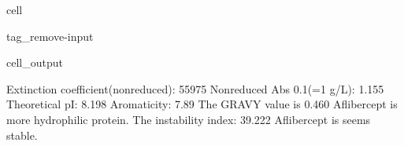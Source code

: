 \documentclass[letterpaper,10pt,english]{jupyterBook}
\begin{document}
\begin{sphinxuseclass}{cell}
\begin{sphinxuseclass}{tag_remove-input}
\begin{sphinxVerbatimOutput}
\begin{sphinxuseclass}{cell_output}
\begin{sphinxVerbatim}[commandchars=\\\{\}]
\PYGZsh{} Extinction coefficient(non\PYGZhy{}reduced): \PYGZhy{}\PYGZhy{}\PYGZhy{}\PYGZhy{}\PYGZhy{}\PYGZhy{}\PYGZhy{}\PYGZhy{}\PYGZhy{}\PYGZhy{}\PYGZhy{}\PYGZhy{}\PYGZhy{}\PYGZhy{}\PYGZhy{}\PYGZhy{}\PYGZhy{}\PYGZhy{}\PYGZhy{}\PYGZhy{}\PYGZhy{}\PYGZhy{}55975
\PYGZsh{} Non\PYGZhy{}reduced Abs 0.1\PYGZpc{}(=1 g/L): \PYGZhy{}\PYGZhy{}\PYGZhy{}\PYGZhy{}\PYGZhy{}\PYGZhy{}\PYGZhy{}\PYGZhy{}\PYGZhy{}\PYGZhy{}\PYGZhy{}\PYGZhy{}\PYGZhy{}\PYGZhy{}\PYGZhy{}\PYGZhy{}\PYGZhy{}\PYGZhy{}\PYGZhy{}\PYGZhy{}\PYGZhy{}\PYGZhy{}\PYGZhy{}\PYGZhy{}\PYGZhy{}\PYGZhy{}\PYGZhy{}\PYGZhy{}\PYGZhy{}1.155
\PYGZsh{} Theoretical pI: \PYGZhy{}\PYGZhy{}\PYGZhy{}\PYGZhy{}\PYGZhy{}\PYGZhy{}\PYGZhy{}\PYGZhy{}\PYGZhy{}\PYGZhy{}\PYGZhy{}\PYGZhy{}\PYGZhy{}\PYGZhy{}\PYGZhy{}\PYGZhy{}\PYGZhy{}\PYGZhy{}\PYGZhy{}\PYGZhy{}\PYGZhy{}\PYGZhy{}\PYGZhy{}\PYGZhy{}\PYGZhy{}\PYGZhy{}\PYGZhy{}\PYGZhy{}\PYGZhy{}\PYGZhy{}\PYGZhy{}\PYGZhy{}\PYGZhy{}\PYGZhy{}\PYGZhy{}\PYGZhy{}\PYGZhy{}\PYGZhy{}\PYGZhy{}\PYGZhy{}\PYGZhy{}\PYGZhy{}\PYGZhy{}8.198
\PYGZsh{} Aromaticity: \PYGZhy{}\PYGZhy{}\PYGZhy{}\PYGZhy{}\PYGZhy{}\PYGZhy{}\PYGZhy{}\PYGZhy{}\PYGZhy{}\PYGZhy{}\PYGZhy{}\PYGZhy{}\PYGZhy{}\PYGZhy{}\PYGZhy{}\PYGZhy{}\PYGZhy{}\PYGZhy{}\PYGZhy{}\PYGZhy{}\PYGZhy{}\PYGZhy{}\PYGZhy{}\PYGZhy{}\PYGZhy{}\PYGZhy{}\PYGZhy{}\PYGZhy{}\PYGZhy{}\PYGZhy{}\PYGZhy{}\PYGZhy{}\PYGZhy{}\PYGZhy{}\PYGZhy{}\PYGZhy{}\PYGZhy{}\PYGZhy{}\PYGZhy{}\PYGZhy{}\PYGZhy{}\PYGZhy{}\PYGZhy{}\PYGZhy{}\PYGZhy{}\PYGZhy{}7.89\PYGZpc{}
\PYGZsh{} The GRAVY value is \PYGZhy{}\PYGZhy{}\PYGZhy{}\PYGZhy{}\PYGZhy{}\PYGZhy{}\PYGZhy{}\PYGZhy{}\PYGZhy{}\PYGZhy{}\PYGZhy{}\PYGZhy{}\PYGZhy{}\PYGZhy{}\PYGZhy{}\PYGZhy{}\PYGZhy{}\PYGZhy{}\PYGZhy{}\PYGZhy{}\PYGZhy{}\PYGZhy{}\PYGZhy{}\PYGZhy{}\PYGZhy{}\PYGZhy{}\PYGZhy{}\PYGZhy{}\PYGZhy{}\PYGZhy{}\PYGZhy{}\PYGZhy{}\PYGZhy{}\PYGZhy{}\PYGZhy{}\PYGZhy{}\PYGZhy{}\PYGZhy{}\PYGZhy{}\PYGZhy{}0.460
  Aflibercept is more hydrophilic protein.
\PYGZsh{} The instability index: \PYGZhy{}\PYGZhy{}\PYGZhy{}\PYGZhy{}\PYGZhy{}\PYGZhy{}\PYGZhy{}\PYGZhy{}\PYGZhy{}\PYGZhy{}\PYGZhy{}\PYGZhy{}\PYGZhy{}\PYGZhy{}\PYGZhy{}\PYGZhy{}\PYGZhy{}\PYGZhy{}\PYGZhy{}\PYGZhy{}\PYGZhy{}\PYGZhy{}\PYGZhy{}\PYGZhy{}\PYGZhy{}\PYGZhy{}\PYGZhy{}\PYGZhy{}\PYGZhy{}\PYGZhy{}\PYGZhy{}\PYGZhy{}\PYGZhy{}\PYGZhy{}\PYGZhy{}39.222
  Aflibercept is seems stable.
\end{sphinxVerbatim}

\end{sphinxuseclass}\end{sphinxVerbatimOutput}

\end{sphinxuseclass}
\end{sphinxuseclass}
\end{document}
